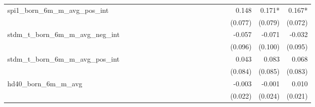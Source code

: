 \begin{tabular}{lrrrrrrrrrrrrrrrrrr}
spi1\_born\_6m\_m\_avg\_pos\_int            &             &             &             &             &             &             &             &             &             &             &             &             &             &             &             &       0.148 &      0.171* &      0.167* \\ 
                                            &             &             &             &             &             &             &             &             &             &             &             &             &             &             &             &     (0.077) &     (0.079) &     (0.072) \\ 
stdm\_t\_born\_6m\_m\_avg\_neg\_int         &             &             &             &             &             &             &             &             &             &             &             &             &             &             &             &      -0.057 &      -0.071 &      -0.032 \\ 
                                            &             &             &             &             &             &             &             &             &             &             &             &             &             &             &             &     (0.096) &     (0.100) &     (0.095) \\ 
stdm\_t\_born\_6m\_m\_avg\_pos\_int         &             &             &             &             &             &             &             &             &             &             &             &             &             &             &             &       0.043 &       0.083 &       0.068 \\ 
                                            &             &             &             &             &             &             &             &             &             &             &             &             &             &             &             &     (0.084) &     (0.085) &     (0.083) \\ 
hd40\_born\_6m\_m\_avg                      &             &             &             &             &             &             &             &             &             &             &             &             &             &             &             &      -0.003 &      -0.001 &       0.010 \\ 
                                            &             &             &             &             &             &             &             &             &             &             &             &             &             &             &             &     (0.022) &     (0.024) &     (0.021) \\ 

\end{tabular}
